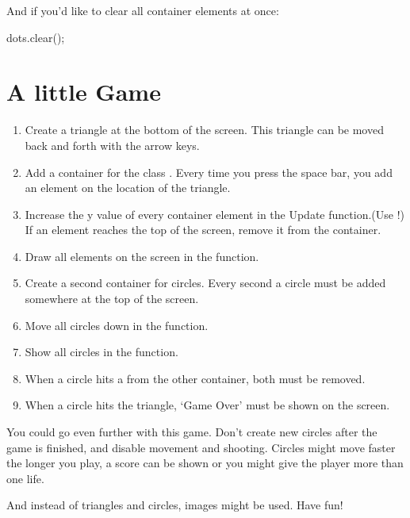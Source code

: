 And if you'd like to clear all container elements at once:

\begin{code}
dots.clear();
\end{code}

\section{A little Game}

\begin{enumerate}
\item Create a triangle at the bottom of the screen. This triangle can be moved back and forth with the arrow keys.
\item Add a container for the class . Every time you press the space bar, you add an element on the location of the triangle.
\item Increase the y value of every container element in the Update function.(Use !) If an element reaches the top of the screen, remove it from the container.
\item Draw all elements on the screen in the  function.
\item Create a second container for circles. Every second a circle must be added somewhere at the top of the screen.
\item Move all circles down in the  function.
\item Show all circles in the  function.
\item When a circle hits a  from the other container, both must be removed.
\item When a circle hits the triangle, `Game Over' must be shown on the screen.
\end{enumerate}

You could go even further with this game. Don't create new circles after the game is finished, and disable movement and shooting. Circles might move faster the longer you play, a score can be shown or you might give the player more than one life.

And instead of triangles and circles, images might be used. Have fun!

